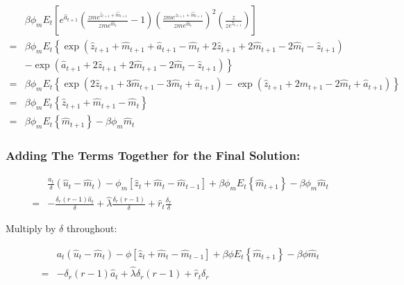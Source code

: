 \documentclass[11pt,preprint, authoryear]{elsarticle}
\numberwithin{equation}{section}
\numberwithin{figure}{section}
\numberwithin{table}{section}
\begin{document}
\[\begin{aligned}&\beta \phi_{m} E_{t}\left[e^{\hat{a}_{t+1}}\left(\frac{z m e^{\hat{z}_{t+1}+\hat{m}_{t+1}}}{z m e^{\hat{m}_{t}}}-1\right)\left(\frac{z m e^{\hat{z}_{t+1}+\hat{m}_{t+1}}}{z m e^{\hat{m}_{t}}}\right)^{2} \left(\frac{z}{z e^{\hat{z}_{t+1}}}\right)\right] \\
=&\beta \phi_{m} E_{t}\left\{\exp \left(\hat{z}_{t+1}+\hat{m}_{t+1}+\hat{a}_{t+1}-\hat{m}_{t}+2 \hat{z}_{t+1}+2 \hat{m}_{t+1}-2 \hat{m}_{t}-\hat{z}_{t+1}\right)\right. \\
& \left.-\exp \left(\hat{a}_{t+1}+2 \hat{z}_{t+1}+2 \hat{m}_{t+1}-2 \hat{m}_{t}-\hat{z}_{t+1}\right)\right\} \\
=&\beta \phi_{m} E_{t}\left\{\exp \left(2 \hat{z}_{t+1}+3 \hat{m}_{t+1}-3 \hat{m}_{t}+\hat{a}_{t+1}\right)-\exp \left(\hat{z}_{t+1}+2 \hat{m}_{t+1}-2 \hat{m}_{t}+\hat{a}_{t+1}\right)\right\} \\
=&\beta \phi_{m} E_{t}\left\{\hat{z}_{t+1}+\hat{m}_{t+1}-\hat{m}_{t}\right\}\\
=& \beta \phi_{m} E_{t}\left\{\hat{m}_{t+1}\right\} - \beta \phi_m \hat{m}_{t}
\end{aligned}\]

\hypertarget{adding-the-terms-together-for-the-final-solution}{%
\subsubsection{Adding The Terms Together for the Final
Solution:}\label{adding-the-terms-together-for-the-final-solution}}

\[\begin{aligned} &\frac{a_{t}}{\delta} \left( \hat{u}_{t}-\hat{m}_{t} \right) - \phi_m \left[\hat{z}_{t}+\hat{m}_{t}-\hat{m}_{t-1}\right] + \beta \phi_{m} E_{t}\left\{\hat{m}_{t+1}\right\} - \beta \phi_m \hat{m}_{t} \\
= &  -\frac{\delta_r(r-1) \hat{a}_t}{\delta} + \hat{\lambda}\frac{\delta_r (r-1)}{\delta} +\hat{r}_t \frac{\delta_r}{\delta}
\end{aligned}\]

Multiply by \(\delta\) throughout:

\[\begin{aligned} & a_t \left( \hat{u}_{t}-\hat{m}_{t} \right) - \phi \left[\hat{z}_{t} + \hat{m}_{t}-\hat{m}_{t-1}\right] + \beta \phi E_{t}\left\{\hat{m}_{t+1}\right\} - \beta \phi \hat{m}_{t} \\
=&  -\delta_r(r-1) \hat{a}_t + \hat{\lambda}\delta_r (r-1) +\hat{r}_t \delta_r \\\end{aligned}\]
\end{document}
